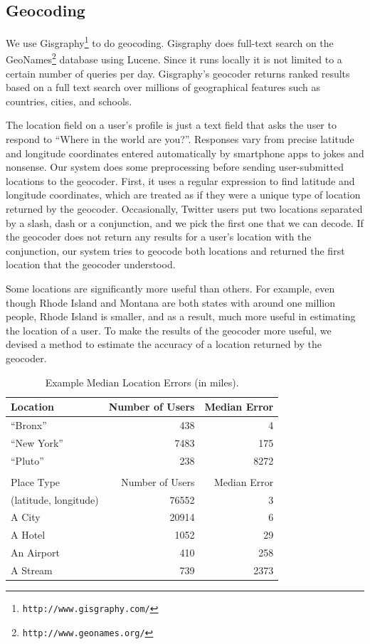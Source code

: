 \documentclass[letterpaper]{article}
\newcommand{\url}[1]{\texttt{#1}}
\newcommand{\flsec}[1]{\subsection{#1}}
\begin{document}
\flsec{Geocoding}
We use Gisgraphy\footnote{\url{http://www.gisgraphy.com/}} to do geocoding.
%
Gisgraphy does full-text search on the
GeoNames\footnote{\url{http://www.geonames.org/}} database using Lucene.
%
Since it runs locally it is not limited to a certain number of queries per day.
%
Gisgraphy's geocoder returns ranked results based on a full text search
over millions of geographical features such as countries, cities, and schools.

The location field on a user's profile is just a text field that asks the user
to respond to ``Where in the world are you?''.
%
Responses vary from precise latitude and longitude coordinates entered
automatically by smartphone apps to jokes and nonsense.
%
Our system does some preprocessing before sending user-submitted locations to
the geocoder.
%
First, it uses a regular expression to find latitude and longitude coordinates,
which are treated as if they were a unique type of location returned by the
geocoder.
%
Occasionally, Twitter users put two locations separated by a slash, dash or a
conjunction, and we pick the first one that we can decode.
%
If the geocoder does not return any results for a user's location with the
conjunction, our system tries to geocode both locations and returned the first
location that the geocoder understood.

Some locations are significantly more useful than others.
%
For example, even though Rhode Island and Montana are both states with around
one million people, Rhode Island is smaller, and as a result, much more useful
in estimating the location of a user.
%
To make the results of the geocoder more useful, we devised a method to
estimate the accuracy of a location returned by the geocoder.

\begin{table}[tb]
\centering
\caption{Example Median Location Errors (in miles).}
\begin{tabular}{l r r}
Location&Number of Users&Median Error\\ \hline
``Bronx''&438&4\\
``New York''&7483&175\\
``Pluto''&238&8272\\ \hline
\\
Place Type&Number of Users&Median Error\\ \hline
(latitude, longitude)&76552&3\\
A City&20914&6\\
A Hotel&1052&29\\
An Airport&410&258\\
A Stream&739&2373\\
\hline\end{tabular}
\label{tab:MedianLocErr}
\end{table}
\end{document}
